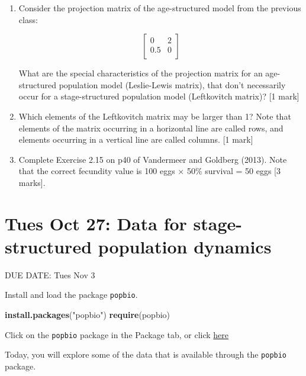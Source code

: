 \documentclass[]{book}
\newenvironment{Shaded}{\begin{snugshade}}{\end{snugshade}}
\newcommand{\KeywordTok}[1]{\textcolor[rgb]{0.13,0.29,0.53}{\textbf{{#1}}}}
\newcommand{\StringTok}[1]{\textcolor[rgb]{0.31,0.60,0.02}{{#1}}}
\newcommand{\NormalTok}[1]{{#1}}
\begin{document}
\begin{enumerate}
\def\labelenumi{\arabic{enumi}.}
\item
  Consider the projection matrix of the age-structured model from the
  previous class:

  \begin{equation}
  \left[
  \begin{array}{cc}
  0 & 2\\
  0.5 & 0\\
  \end{array}
  \right]
  \end{equation}

  What are the special characteristics of the projection matrix for an
  age-structured population model (Leslie-Lewis matrix), that don't
  necessarily occur for a stage-structured population model (Leftkovitch
  matrix)? {[}1 mark{]}
\item
  Which elements of the Leftkovitch matrix may be larger than 1? Note
  that elements of the matrix occurring in a horizontal line are called
  rows, and elements occurring in a vertical line are called columns.
  {[}1 mark{]}
\item
  Complete Exercise 2.15 on p40 of Vandermeer and Goldberg (2013). Note
  that the correct fecundity value is 100 eggs \(\times\) 50\% survival
  = 50 eggs {[}3 marks{]}.
\end{enumerate}

\chapter{Tues Oct 27: Data for stage-structured population
dynamics}\label{tues-oct-27-data-for-stage-structured-population-dynamics}

DUE DATE: Tues Nov 3

Install and load the package \texttt{popbio}.

\begin{Shaded}
\begin{Highlighting}[]
\KeywordTok{install.packages}\NormalTok{(}\StringTok{"popbio"}\NormalTok{)}
\KeywordTok{require}\NormalTok{(popbio)}
\end{Highlighting}
\end{Shaded}

Click on the \texttt{popbio} package in the Package tab, or click
\href{https://cran.r-project.org/web/packages/popbio/popbio.pdf}{here}

Today, you will explore some of the data that is available through the
\texttt{popbio} package.
\end{document}
